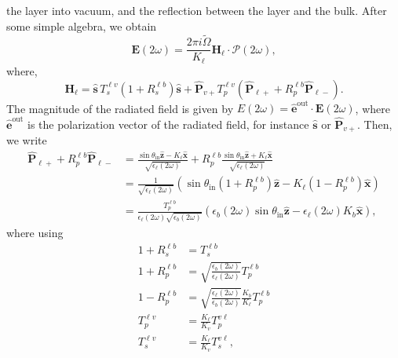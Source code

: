 \documentclass[10pt]{article}
\begin{document}
the layer into vacuum, and the reflection between the layer and the bulk. After
some simple algebra, we obtain
\begin{equation*}\label{r8}
\mathbf{E}(2\omega) = \frac{2\pi i\tilde{\Omega}}{K_{\ell}}
\mathbf{H}_{\ell}\cdot\boldsymbol{\mathcal{P}}(2\omega),
\end{equation*}
where,
\begin{equation}\label{r9}
\mathbf{H}_{\ell}
= \hat{\mathbf{s}}\,T_s^{\ell v}\left(1+R_s^{\ell b}\right)\hat{\mathbf{s}}
+ \hat{\mathbf{P}}_{v+}T_{p}^{\ell v}
\left(
\hat{\mathbf{P}}_{\ell +} +R_{p}^{\ell b}\hat{\mathbf{P}}_{\ell -}
\right). 
\end{equation}
The magnitude of the radiated field is given by
$E(2\omega)=\hat{\mathbf{e}}^{\mathrm{out}}\cdot\mathbf{E}(2\omega)$, where
$\hat{\mathbf{e}}^{\mathrm{out}}$ is the polarization vector of the radiated
field, for instance $\hat{\mathbf{s}}$ or $\hat{\mathbf{P}}_{v+}$. Then, we
write
\begin{equation*}\label{m1}
\begin{split}
\hat{\mathbf{P}}_{\ell +} + R_{p}^{\ell b}\hat{\mathbf{P}}_{\ell -}
&= \frac{\sin\theta_{\mathrm{in}}\hat{\mathbf{z}} - K_{\ell}\hat{\mathbf{x}}}
        {\sqrt{\epsilon_{\ell}(2\omega)}}
 + R_{p}^{\ell b}
   \frac{\sin\theta_{\mathrm{in}}\hat{\mathbf{z}} + K_{\ell}\hat{\mathbf{x}}}
        {\sqrt{\epsilon_{\ell}(2\omega)}}
\\\nonumber
&= \frac{1}{\sqrt{\epsilon_{\ell}(2\omega)}}
\left(
\sin\theta_{\mathrm{in}}(1+R^{\ell b}_{p})\hat{\mathbf{z}}
- K_{\ell}(1-R^{\ell b}_{p})\hat{\mathbf{x}} 
\right)
\\\nonumber 
&= \frac{T^{\ell b}_{p}}{\epsilon_{\ell}(2\omega)\sqrt{\epsilon_{b}(2\omega)}}
\left(
  \epsilon_{b}(2\omega)\sin\theta_{\mathrm{in}}\hat{\mathbf{z}} 
- \epsilon_{\ell}(2\omega)K_{b}\hat{\mathbf{x}}
\right)
,
\end{split}
\end{equation*}
where using
\begin{align}
1 + R^{\ell b}_{s} &= T^{\ell b}_{s}\nonumber\\
1 + R^{\ell b}_{p}
&= \sqrt{\frac{\epsilon_{b}(2\omega)}{\epsilon_{\ell}(2\omega)}}T^{\ell b}_{p} 
\nonumber\\
1 - R^{\ell b}_{p}
&= \sqrt{\frac{\epsilon_{\ell}(2\omega)}{\epsilon_{b}(2\omega)}}
   \frac{K_{b}}{K_{\ell}}T^{\ell b}_{p}\\
T^{\ell v}_{p} &= \frac{K_{\ell}}{K_{v}}T^{v\ell}_{p}\nonumber\\
T^{\ell v}_{s} &= \frac{K_{\ell}}{K_{v}}T^{v\ell}_{s}\nonumber
,
\end{align}
\end{document}
